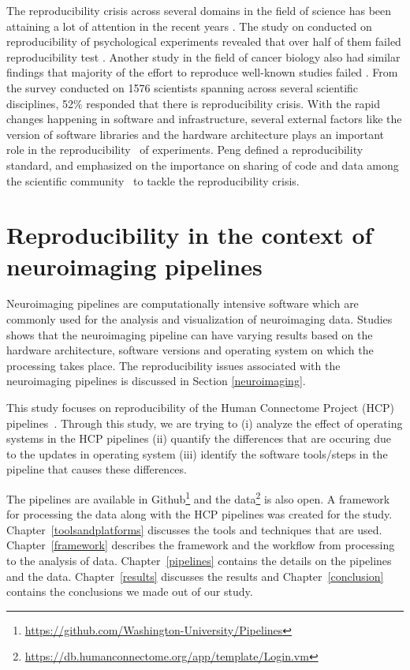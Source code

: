The reproducibility crisis across several domains in the field of science has been attaining a lot of attention in the recent years \cite{aac4716,Begley2012,Button2013,Baker2016,Estimating-reproducibility,Gla15}. The study on conducted on reproducibility of psychological experiments revealed that over half of them failed reproducibility test \cite{aac4716}. Another study in the field of cancer biology also had similar findings that majority of the effort to reproduce well-known studies failed \cite{Begley2012}. From the survey conducted on 1576 scientists spanning across several scientific disciplines, 52\% responded that there is reproducibility crisis.
With the rapid changes happening in software and infrastructure, several external factors like the version of software libraries and the hardware architecture plays an important role in the reproducibility~\cite{10.1371/journal.pone.0038234,Gla15} of experiments. Peng defined a reproducibility standard, and emphasized on the importance on sharing of code and data among the scientific community~\cite{Peng2011} to tackle the reproducibility  crisis.

\section{Reproducibility in the context of neuroimaging pipelines}
Neuroimaging pipelines are computationally intensive software which are commonly used for the analysis and visualization of neuroimaging data. Studies~\cite{10.1371/journal.pone.0038234,Gla15} shows that the neuroimaging pipeline can have varying results based on the hardware architecture, software versions and operating system on which the processing takes place. The reproducibility issues associated with the neuroimaging pipelines is discussed in Section \ref{neuroimaging}.

This study focuses on reproducibility of the Human Connectome Project (HCP) pipelines~\cite{Gla13}. Through this study, we are trying to (i) analyze the effect of operating systems in the HCP pipelines (ii) quantify the differences that are occuring due to the updates in operating system (iii) identify the software tools/steps in the pipeline that causes these differences.

The pipelines are available in Github\footnote{\url{https://github.com/Washington-University/Pipelines}} and the data\footnote{\url{https://db.humanconnectome.org/app/template/Login.vm}} is also open. A framework for processing the data along with the HCP pipelines was created for the study. Chapter~\ref{toolsandplatforms} discusses the tools and techniques that are used. Chapter~\ref{framework} describes the framework and the workflow from processing to the analysis of data. Chapter~\ref{pipelines} contains the details on the pipelines and the data. Chapter~\ref{results} discusses the results and Chapter~\ref{conclusion} contains the conclusions we made out of our study.


